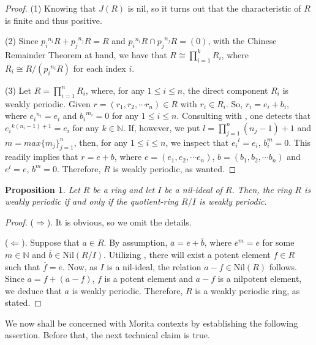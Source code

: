 \documentclass[12pt]{amsart}
\newtheorem{prop}[thm]{Proposition}
\theoremstyle{definition}
\theoremstyle{remark}
\numberwithin{equation}{section}
\begin{document}
\begin{proof}
(1) Knowing that $J(R)$ is nil, so it turns out that the characteristic of $R$ is finite and thus positive.

\noindent (2) Since ${p_i}^{n_i}R+{p_j}^{n_j}R=R$ and ${p_i}^{n_i}R \cap {p_j}^{n_j}R=(0)$, with the Chinese Remainder Theorem at hand, we have that $R \cong \prod_{i=1}^k R_i$, where $R_i\cong R/({p_i}^{n_i}R)$ for each index $i$.

\noindent (3) Let $R=\prod_{i=1}^n R_i$, where, for any $1 \leq i \leq n$, the direct component $R_i$ is weakly periodic. Given $r=(r_1,r_2, \cdots r_n) \in R$ with $r_i \in R_i$. So, $r_i=e_i+b_i$, where ${e_i}^{n_i}=e_i$ and ${b_i}^{m_i}=0$ for any $1 \leq i \leq n$. Consulting with \cite[Lemma 2.3(1)]{BCL}, one detects that ${e_i}^{k(n_i-1)+1}=e_i$ for any $k \in \mathbb{N}$. If, however, we put $l=\prod_{j=1}^n (n_j-1)+1$ and $m=max\{m_j\}_{j=1}^n$, then, for any $1 \leq i \leq n$, we inspect that ${e_i}^l=e_i$, $b_i^m=0$. This readily implies that $r=e+b$, where $e=(e_1,e_2, \cdots e_n)$, $b=(b_1,b_2, \cdots b_n)$ and $e^l=e$, $b^m=0$. Therefore, $R$ is weakly periodic, as wanted.
\end{proof}

\begin{prop}\label{proposition1.7}
Let $R$ be a ring and let $I$ be a nil-ideal of $R$. Then, the ring $R$ is weakly periodic if and only if the quotient-ring $R/I$ is weakly periodic.
\end{prop}

\begin{proof}
($\Rightarrow$). It is obvious, so we omit the details.

($\Leftarrow$). Suppose that $a\in R$. By assumption, $\overline{a}=\overline{e}+\overline{b}$, where ${\overline{e}}^m=\overline{e}$ for some $m \in \mathbb{N}$ and $\overline{b}\in \mathrm{Nil}(R/I)$. Utilizing \cite[Corollary 6]{khurana2021lifting}, there will exist a potent element $f\in R$ such that $\overline{f}=\overline{e}$. Now, as $I$ is a nil-ideal, the relation $a-f\in \mathrm{Nil}(R)$ follows. Since $a=f+(a-f)$, $f$ is a potent element and $a-f$ is a nilpotent element, we deduce that $a$ is weakly periodic. Therefore, $R$ is a weakly periodic ring, as stated.
\end{proof}

\medskip

We now shall be concerned with Morita contexts by establishing the following assertion. Before that, the next technical claim is true.
\end{document}
